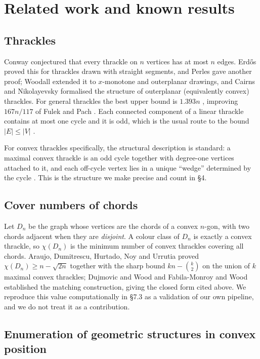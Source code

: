 \documentclass[11pt,a4paper]{article}
\theoremstyle{definition}
\theoremstyle{plain}
\begin{document}
\section{Related work and known results}

\subsection{Thrackles}

Conway \cite{Conway} conjectured that every thrackle on $n$ vertices has at most
$n$ edges.  Erdős \cite{Erdos} proved this for thrackles drawn with straight
segments, and Perles gave another proof; Woodall \cite{Woodall} extended it to
$x$-monotone and outerplanar drawings, and Cairns and Nikolayevsky
\cite{CN00,CN12} formalised the structure of outerplanar (equivalently convex)
thrackles.  For general thrackles the best upper bound is $1.393n$ \cite{Xu},
improving $167n/117$ of Fulek and Pach \cite{FP}.  Each connected component of a
linear thrackle contains at most one cycle and it is odd, which is the usual
route to the bound $|E|\le|V|$ \cite{Wikipedia2024}.

For convex thrackles specifically, the structural description is standard: a
maximal convex thrackle is an odd cycle together with degree-one vertices
attached to it, and each off-cycle vertex lies in a unique ``wedge'' determined
by the cycle \cite{ADHNU,DW}.  This is the structure we make precise and count
in §4.

\subsection{Cover numbers of chords}

Let $D_n$ be the graph whose vertices are the chords of a convex $n$-gon, with
two chords adjacent when they are \emph{disjoint}.  A colour class of $D_n$ is
exactly a convex thrackle, so $\chi(D_n)$ is the minimum number of convex
thrackles covering all chords.  Araujo, Dumitrescu, Hurtado, Noy and Urrutia
\cite{ADHNU} proved $\chi(D_n)\ge n-\sqrt{2n}$ together with the sharp bound
$kn-\binom k2$ on the union of $k$ maximal convex thrackles; Dujmovic and Wood
\cite{DW} and Fabila-Monroy and Wood \cite{FW} established the matching
construction, giving the closed form cited above.  We reproduce this value
computationally in §7.3 as a validation of our own pipeline, and we do not
treat it as a contribution.

\subsection{Enumeration of geometric structures in convex position}
\end{document}
